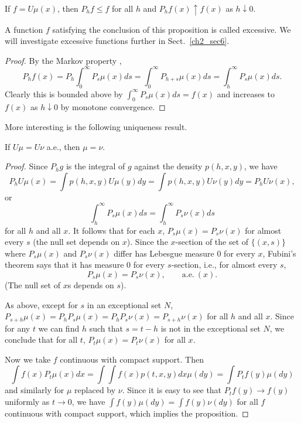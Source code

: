 \begin{proposition}\label{prop:ch2_3.4}
If $f = U\mu(x)$, then $P_hf \leq f$ for all $h$ and $P_hf(x) \uparrow f(x)$ as $h \downarrow 0$.
\end{proposition}

A function $f$ satisfying the conclusion of this proposition is called excessive. We will investigate excessive functions further in Sect.\ \ref{ch2_sec6}.

\begin{proof}
By the Markov property ,
\begin{equation}\label{eq:ch2_3.12}
    P_hf(x) = P_h\int_0^\infty P_s\mu(x)ds = \int_0^\infty P_{h+s}\mu(x)ds = \int_h^\infty P_s\mu(x)ds.
\end{equation}
Clearly this is bounded above by $\int_0^\infty P_s\mu(x)ds = f(x)$ and increases to $f(x)$ as $h \downarrow 0$ by monotone convergence.
\end{proof}

More interesting is the following uniqueness result.

\begin{proposition}\label{prop:ch2_3.5}
If $U\mu = U\nu$ a.e., then $\mu = \nu$.
\end{proposition}

\begin{proof}
Since $P_hg$ is the integral of $g$ against the density $p(h,x,y)$, we have
\[
    P_hU\mu(x) = \int p(h,x,y)U\mu(y)dy = \int p(h,x,y)U\nu(y)dy = P_hU\nu(x),
\]
or
\[
    \int_h^\infty P_s\mu(x)ds = \int_h^\infty P_s\nu(x)ds
\]
for all $h$ and all $x$. It follows that for each $x$, $P_s\mu(x) = P_s\nu(x)$ for almost every $s$ (the null set depends on $x$). Since the $x$-section of the set of $\{(x,s)\}$ where $P_s\mu(x)$ and $P_s\nu(x)$ differ has Lebesgue measure $0$ for every $x$, Fubini's theorem says that it has measure $0$ for every $s$-section, i.e., for almost every $s$,
\[
    P_s\mu(x) = P_s\nu(x), \qquad \text{a.e.}~(x).
\]
(The null set of $x$s depends on $s$).

As above, except for $s$ in an exceptional set $N$, $P_{s+h}\mu(x) = P_hP_s\mu(x) = P_hP_s\nu(x) = P_{s+h}\nu(x)$ for all $h$ and all $x$. Since for any $t$ we can find $h$ such that $s = t-h$ is not in the exceptional set $N$, we conclude that for all $t$, $P_t\mu(x) = P_t\nu(x)$ for all $x$.

Now we take $f$ continuous with compact support. Then
\begin{equation}\label{eq:ch2_3.13}
    \int f(x)P_t\mu(x)dx = \int\int f(x)p(t,x,y)dx\mu(dy) = \int P_tf(y)\mu(dy)
\end{equation}
and similarly for $\mu$ replaced by $\nu$. Since it is easy to see that $P_tf(y) \to f(y)$ uniformly as $t \to 0$, we have $\int f(y)\mu(dy) = \int f(y)\nu(dy)$ for all $f$ continuous with compact support, which implies the proposition.
\end{proof}

